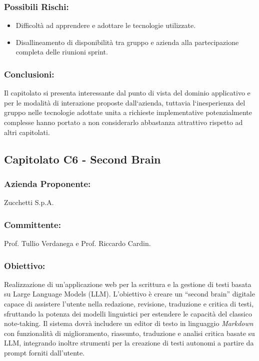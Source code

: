 \documentclass[a4paper,12pt]{article}
\begin{document}
\subsubsection*{Possibili Rischi:}
\begin{itemize}
    \item Difficoltà ad apprendere e adottare le tecnologie utilizzate.
    \item Disallineamento di disponibilità tra gruppo e azienda alla partecipazione
          completa delle riunioni sprint.
\end{itemize}

\subsubsection*{Conclusioni:}
Il capitolato si presenta interessante dal punto di vista del dominio applicativo e per le modalità di interazione proposte dall`azienda, tuttavia l`inesperienza del gruppo nelle tecnologie adottate unita a richieste implementative potenzialmente complesse hanno portato a non considerarlo abbastanza attrattivo rispetto ad altri capitolati.
\vspace{2.0cm}

\subsection{Capitolato C6 - Second Brain}
\subsubsection*{Azienda Proponente:} Zucchetti S.p.A.
\subsubsection*{Committente:} Prof. Tullio Verdanega e Prof. Riccardo Cardin.
\subsubsection*{Obiettivo:}
Realizzazione di un'applicazione web per la scrittura e la gestione di testi basata su Large Language Models (LLM).
L'obiettivo è creare un “second brain” digitale capace di assistere l'utente nella redazione, revisione, traduzione e critica di testi, sfruttando la potenza dei modelli linguistici per estendere le capacità del classico note-taking.
Il sistema dovrà includere un editor di testo in linguaggio \textit{Markdown} con funzionalità di miglioramento, riassunto, traduzione e analisi critica basate su LLM, integrando inoltre strumenti per la creazione di testi autonomi a partire da prompt forniti dall'utente.
\end{document}
